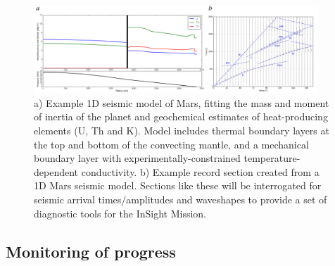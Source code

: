 \documentclass[11pt,twoside,a4paper]{article}
\begin{document}
\begin{figure}[!ht]
  \centering
  \includegraphics[width=0.95\textwidth]{figures/mars_model}
  \caption{a) Example 1D seismic model of Mars, fitting the mass and moment of inertia of the planet and geochemical estimates of heat-producing elements (U, Th and K). Model includes thermal boundary layers at the top and bottom of the convecting mantle, and a mechanical boundary layer with experimentally-constrained temperature-dependent conductivity. b) Example record section created from a 1D Mars seismic model. Sections like these will be interrogated for seismic arrival times/amplitudes and waveshapes to provide a set of diagnostic tools for the InSight Mission.}
  \label{fig:seismograms}
\end{figure}










\subsection*{Monitoring of progress}
\end{document}
